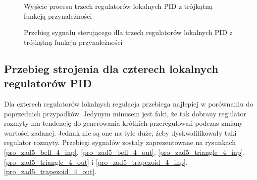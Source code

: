 \begin{figure}[t]
    \centering
    \caption{Wyjście procesu trzech regulatorów lokalnych PID z trójkątną funkcją przynależności}
    \label{pro_zad5_triangle_3_out}
\end{figure}

\begin{figure}[b]
    \centering
    \caption{Przebieg sygnału sterującego dla trzech regulatorów lokalnych PID z trójkątną  funkcją przynależności}
    \label{pro_zad5_triangle_3_inp}
\end{figure}
\FloatBarrier

\subsection{Przebieg strojenia dla czterech lokalnych regulatorów PID}
Dla czterech regulatorów lokalnych regulacja przebiega najlepiej w porównaniu do poprzednich przypadków. Jedynym minusem jest fakt, że tak dobrany regulator rozmyty ma tendencję do generowania krótkich przeregulowań podczas zmiany wartości zadanej. Jednak nie są one na tyle duże, żeby dyskwalifikowały taki regulator rozmyty. Przebiegi sygnałów zostały zaprezentowane na rysunkach \ref{pro_zad5_bell_4_inp}, \ref{pro_zad5_bell_4_out}, \ref{pro_zad5_triangle_4_inp}, \ref{pro_zad5_triangle_4_out} i \ref{pro_zad5_trapezoid_4_inp}, \ref{pro_zad5_trapezoid_4_out}.  

